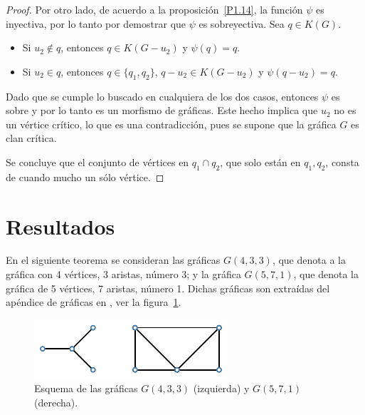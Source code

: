 \documentclass[12pt]{book}
\theoremstyle{definition}
\begin{document}
\begin{proof}
Por otro lado, de acuerdo a la proposición~\ref{P1.14}, la función $\psi$ es inyectiva, por lo tanto por demostrar que $\psi$ es sobreyectiva. Sea $q\in K(G)$. 
\begin{itemize}
\item Si $u_2\notin q$, entonces $q\in K(G-u_2)$ y $\psi(q)=q$.
\item Si $u_2\in q$, entonces $q\in \{q_1,q_2\}$, $q-u_2\in K(G-u_2)$ y $\psi(q-u_2)=q$.
\end{itemize}
Dado que se cumple lo buscado en cualquiera de los dos casos, entonces $\psi$ es sobre y por lo tanto es un morfismo de gráficas. Este hecho implica que $u_2$ no es un vértice crítico, lo que es una contradicción, pues se supone que la gráfica $G$ es clan crítica.

Se concluye que el conjunto de vértices en $q_1\cap q_2$, que solo están en $q_1,q_2$, consta de cuando mucho un sólo vértice.
\end{proof}

\section{Resultados}

En el siguiente teorema se consideran las gráficas $G(4,3,3)$, que denota a la gráfica con 4 vértices, 3 aristas, número 3; y la gráfica $G(5,7,1)$, que denota la gráfica de 5 vértices, 7 aristas, número 1. Dichas gráficas son extraídas del apéndice de gráficas en \cite{Harary:1969}, ver la figura~\ref{F1}.

\begin{figure}[!htbp]
	\centering
	\includegraphics[scale=1.2]{Fig0.pdf}
	\caption{Esquema de las gráficas $G(4,3,3)$ (izquierda) y $G(5,7,1)$ (derecha).\label{F1}}
\end{figure}
\end{document}

